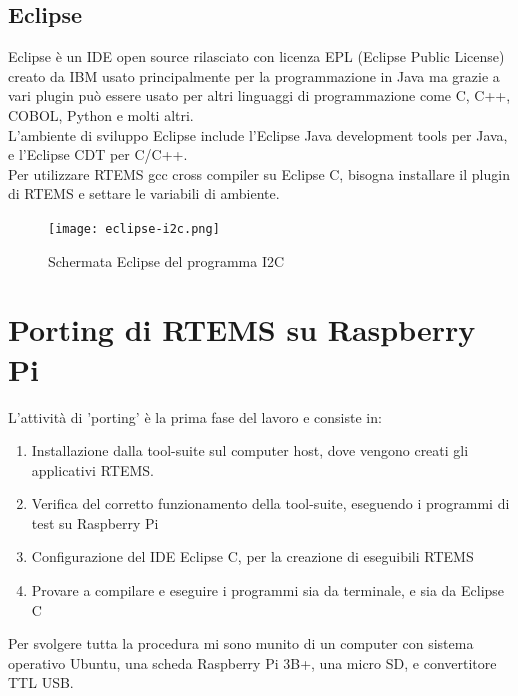 \documentclass[12pt, a4paper, titlepage, oneside]{book}
\begin{document}
\begin{flushleft}
\section{Eclipse}
Eclipse è un IDE open source rilasciato con licenza EPL (Eclipse Public License) creato da IBM usato principalmente per la programmazione in Java ma grazie a vari plugin può essere usato per altri linguaggi di programmazione come C, C++, COBOL, Python e molti altri. \\
L'ambiente di sviluppo Eclipse include l'Eclipse Java development tools per Java, e l'Eclipse CDT per C/C++. \\
Per utilizzare RTEMS gcc cross compiler su Eclipse C, bisogna installare il plugin di RTEMS e settare le variabili di ambiente.
\begin{figure} [h]
    \centering
    \texttt{[image: eclipse-i2c.png]}
    \caption{Schermata Eclipse del programma I2C }
    \label{fig:eclips-i2c}
\end{figure}
\chapter{Porting di RTEMS su Raspberry Pi }

L'attività di 'porting' è la prima fase del lavoro e consiste in:
\begin{enumerate}
    \item Installazione dalla tool-suite sul computer host, dove vengono creati gli applicativi RTEMS.
    \item Verifica del corretto funzionamento della tool-suite, eseguendo i programmi di test su Raspberry Pi
    \item Configurazione del IDE Eclipse C, per la creazione di eseguibili RTEMS
    \item Provare a compilare e eseguire i programmi sia da terminale, e sia da Eclipse C
\end{enumerate}
Per svolgere tutta la procedura mi sono munito di un computer con sistema operativo Ubuntu, una scheda Raspberry Pi 3B+, una micro SD, e convertitore TTL USB.\\


\end{flushleft}
\end{document}
